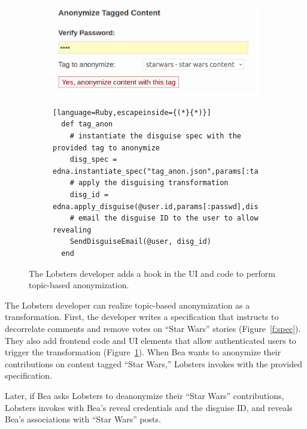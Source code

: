 \begin{figure}[t]
  \centering
  \begin{subfigure}[t]{0.5\columnwidth}
  \includegraphics[width=\columnwidth]{figs/lobsters_catanon}
  \end{subfigure}
  \begin{subfigure}[t]{\columnwidth}
  \begin{lstlisting}[language=Ruby,escapeinside={(*}{*)}]
  def tag_anon
    # instantiate the disguise spec with the provided tag to anonymize
    disg_spec = edna.instantiate_spec("tag_anon.json",params[:tag])
    # apply the disguising transformation
    disg_id = edna.apply_disguise(@user.id,params[:passwd],disg_spec)
    # email the disguise ID to the user to allow revealing
    SendDisguiseEmail(@user, disg_id)
  end
  \end{lstlisting}
  \end{subfigure}
  \vspace*{-1em}
    \caption[Hook to invoke topic-based anonymization.]{The Lobsters developer adds a hook in the UI and code to perform
      topic-based anonymization.}
  \label{f:lobsters_hook}
  \end{figure}

%
The Lobsters developer can realize topic-based anonymization as a \xxing
transformation.
%
First, the developer writes a \xx specification that instructs \sys to
decorrelate comments and remove votes on ``Star Wars'' stories
(Figure~\ref{f:spec}).
%
They also add frontend code and UI elements that allow authenticated users to
trigger the \xxing transformation (Figure~\ref{f:lobsters_hook}).
%
When Bea wants to anonymize their contributions on content tagged ``Star Wars,''
Lobsters invokes \sys with the provided specification.

%
Later, if Bea asks Lobsters to deanonymize their ``Star Wars'' contributions, Lobsters
invokes \sys with Bea's reveal credentials and the disguise ID, and \sys reveals
Bea's associations with ``Star Wars'' posts.
%

